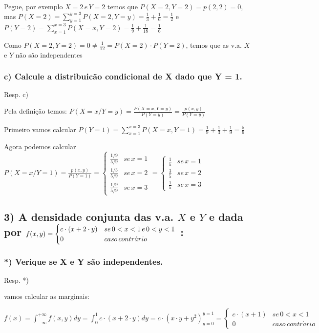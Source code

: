 \documentclass[portuguese]{article}
\begin{document}
Pegue, por exemplo $X=2\, e\, Y=2$ temos que $P(X=2,Y=2)=p(2,2)=0$,
mas $P(X=2)=\sum_{y=1}^{y=3}P(X=2,Y=y)=\frac{1}{3}+\frac{1}{6}=\frac{1}{2}$
e $P(Y=2)=\sum_{x=1}^{x=3}P(X=x,Y=2)=\frac{1}{9}+\frac{1}{18}=\frac{1}{6}$

Como $P(X=2,Y=2)=0\neq\frac{1}{12}=P(X=2)\cdot P(Y=2)$, temos que
as v.a. $X$ e $Y$ não são independentes


\subsubsection*{\textmd{c) Calcule a distribuicão condicional de X dado que Y = 1.}}

Resp. c)

Pela definição temos: $P(X=x/Y=y)=\frac{P(X=x,Y=y)}{P(Y=y)}=\frac{p(x,y)}{P(Y=y)}$

Primeiro vamos calcular $P(Y=1)=\sum_{x=1}^{x=3}P(X=x,Y=1)=\frac{1}{9}+\frac{1}{3}+\frac{1}{9}=\frac{5}{9}$

Agora podemos calcular $P(X=x/Y=1)=\frac{p(x,y)}{P(Y=1)}=\begin{cases}
\frac{1/9}{5/9} & se\, x=1\\
\frac{1/3}{5/9} & se\, x=2\\
\frac{1/9}{5/9} & se\, x=3
\end{cases}=\begin{cases}
\frac{1}{5} & se\, x=1\\
\frac{3}{5} & se\, x=2\\
\frac{1}{5} & se\, x=3
\end{cases}$


\subsection*{\textmd{3) A densidade conjunta das v.a. $X$ e $Y$ e dada por $f(x,y)=\protect\begin{cases}
c\cdot(x+2\cdot y) & se\,0<x<1\, e\,0<y<1\protect\\
0 & caso\, contr\acute{a}rio
\protect\end{cases}$ : }}


\subsubsection*{\textmd{{*}) Verique se X e Y são independentes. }}

Resp. {*})

vamos calcular as marginais:

$f(x)=\int_{-\infty}^{+\infty}f(x,y)dy=\int_{0}^{1}c\cdot(x+2\cdot y)dy=c\cdot(x\cdot y+y^{2})_{y=0}^{y=1}=\begin{cases}
c\cdot(x+1) & se\,0<x<1\\
0 & caso\, contr\acute{a}rio
\end{cases}$
\end{document}

